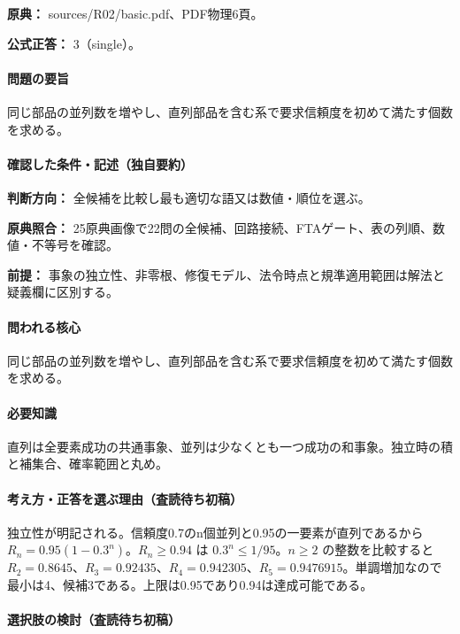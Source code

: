 \noindent\textbf{原典：} sources/R02/basic.pdf、PDF物理6頁。

\textbf{公式正答：} 3（single）。

\paragraph{問題の要旨} 同じ部品の並列数を増やし、直列部品を含む系で要求信頼度を初めて満たす個数を求める。

\paragraph{確認した条件・記述（独自要約）}\mbox{}\par

\noindent\textbf{判断方向：} 全候補を比較し最も適切な語又は数値・順位を選ぶ。\par

\noindent\textbf{原典照合：} 25原典画像で22問の全候補、回路接続、FTAゲート、表の列順、数値・不等号を確認。\par

\noindent\textbf{前提：} 事象の独立性、非零根、修復モデル、法令時点と規準適用範囲は解法と疑義欄に区別する。\par

\paragraph{問われる核心} 同じ部品の並列数を増やし、直列部品を含む系で要求信頼度を初めて満たす個数を求める。

\paragraph{必要知識} 直列は全要素成功の共通事象、並列は少なくとも一つ成功の和事象。独立時の積と補集合、確率範囲と丸め。

\paragraph{考え方・正答を選ぶ理由（査読待ち初稿）} 独立性が明記される。信頼度0.7のn個並列と0.95の一要素が直列であるから \(R_n=0.95(1-0.3^n)\)。\(R_n\ge0.94\) は \(0.3^n\le1/95\)。\(n\ge2\) の整数を比較すると \(R_2=0.8645\)、\(R_3=0.92435\)、\(R_4=0.942305\)、\(R_5=0.9476915\)。単調増加なので最小は4、候補3である。上限は0.95であり0.94は達成可能である。

\paragraph{選択肢の検討（査読待ち初稿）}\mbox{}\par

